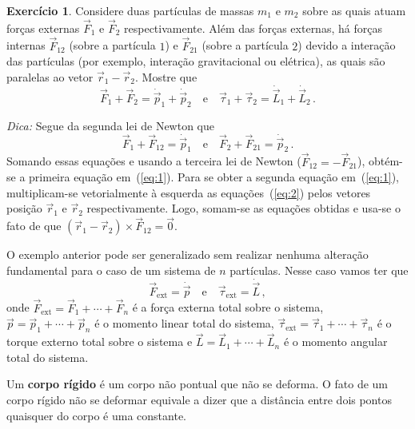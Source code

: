 \documentclass[12pt,a4paper]{article}
\theoremstyle{definition}
\newtheorem{ex}{Exercício}[section]
\begin{document}
\begin{ex}
  Considere duas partículas de massas $m_1$ e $m_2$ sobre as quais
  atuam forças externas $\vec F_1$ e $\vec F_2$ respectivamente. Além
  das forças externas, há forças internas $\vec F_{12}$ (sobre a
  partícula $1$) e $\vec F_{21}$ (sobre a partícula $2$) devido a
  interação das partículas (por exemplo, interação gravitacional ou
  elétrica), as quais são paralelas ao vetor $\vec r_1-\vec
  r_2$. Mostre que
  \begin{equation}
    \label{eq:1}
    \vec F_1+\vec F_2=\dot{\vec p}_1+\dot{\vec p}_2\quad\text{e}\quad\vec\tau_1+\vec\tau_2=\dot{\vec L}_1+\dot{\vec L}_2\,.
  \end{equation}

  \noindent\textit{Dica:} Segue da segunda lei de Newton que
  \begin{equation}
    \label{eq:2}
      \vec F_1+\vec F_{12}=\dot{\vec p}_1\quad\text{e}\quad\vec F_2+\vec F_{21}=\dot{\vec p}_2\,.
  \end{equation}
  Somando essas equações e usando a terceira lei de Newton
  ($\vec F_{12}=-\vec F_{21}$), obtém-se a primeira equação
  em~(\ref{eq:1}). Para se obter a segunda equação em~(\ref{eq:1}),
  multiplicam-se vetorialmente à esquerda as equações~(\ref{eq:2})
  pelos vetores posição $\vec r_1$ e $\vec r_2$ respectivamente. Logo,
  somam-se as equações obtidas e usa-se o fato de que
  $(\vec r_1-\vec r_2)\times\vec F_{12}=\vec 0$.
\end{ex}

O exemplo anterior pode ser generalizado sem realizar nenhuma
alteração fundamental para o caso de um sistema de $n$
partículas. Nesse caso vamos ter que
\begin{equation}
  \label{eq:3}
    \vec F_{\mathrm{ext}}=\dot{\vec p}\quad\text{e}\quad
    \vec \tau_{\mathrm{ext}}=\dot{\vec L}\,,
\end{equation}
onde $\vec F_{\mathrm{ext}}=\vec F_1+\cdots+\vec F_n$ é a força
externa total sobre o sistema, $\vec p=\vec p_1+\cdots+\vec p_n$ é o
momento linear total do sistema,
$\vec\tau_{\mathrm{ext}}=\vec\tau_1+\cdots+\vec\tau_n$ é o torque
externo total sobre o sistema e $\vec L=\vec L_1+\cdots+\vec L_n$ é o
momento angular total do sistema.

Um \textbf{corpo rígido} é um corpo não pontual que não se deforma. O
fato de um corpo rígido não se deformar equivale a dizer que a
distância entre dois pontos quaisquer do corpo é uma constante.
\end{document}
